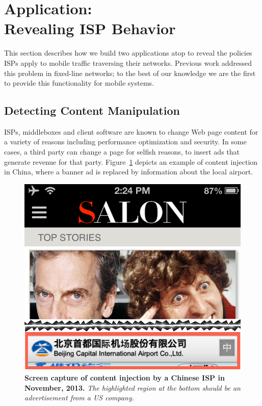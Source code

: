 \section{Application: \\
Revealing ISP Behavior}
\label{sec:isp-behavior}

This section describes how we build two applications atop \meddle to 
reveal the policies ISPs apply to mobile traffic traversing their networks. 
Previous work addressed this problem in fixed-line networks; to 
the best of our knowledge we are the first to provide this functionality for 
mobile systems.

\subsection{Detecting Content Manipulation}

ISPs, middleboxes and client software are known to change Web page content for 
a variety of reasons including performance optimization and security. In some cases, 
a third party can change a page for selfish reasons, \eg to insert ads that generate revenue 
for that party. Figure~\ref{fig:tripnet-example} depicts an example of content injection in China, where 
a banner ad is replaced by information about the local airport.

\begin{figure}
\centering
\includegraphics[width=0.8\linewidth]{figures/injectioncrop.png}
\caption{\textbf{Screen capture of content injection by a Chinese ISP in November, 2013.} \emph{The 
highlighted region at the bottom should be an advertisement from a US company.} }
\vspace{\postfigspace}
\label{fig:tripnet-example}
\end{figure}


